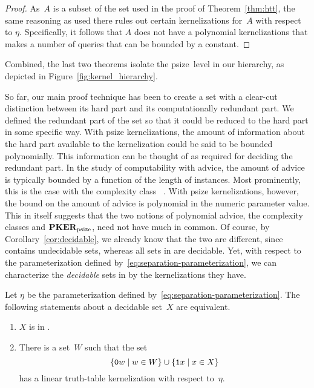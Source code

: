 \begin{proof}
  As~$A$ is a subset of the set used in the proof of Theorem~\ref{thm:htt}, the same reasoning as used there rules out certain kernelizations for~$A$ with respect to $\eta$.
  Specifically, it follows that $A$ does not have a polynomial kernelizations that makes a  number of queries that can be bounded by a constant.
\end{proof}

Combined, the last two theorems isolate the psize~level in our hierarchy, as depicted in Figure~\ref{fig:kernel_hierarchy}.

So far, our main proof technique has been to create a set with a clear-cut distinction between its hard part and its computationally redundant part.
We defined the redundant part of the set so that it could be reduced to the hard part in some specific way.
With psize kernelizations, the amount of information about the hard part available to the kernelization could be said to be bounded polynomially.
This information can be thought of as  required for deciding the redundant part.
In the study of computability with advice, the amount of advice is typically bounded by a function of the length of instances.
Most prominently, this is the case with the complexity class ~\parencite{arora2009computational}.
With psize kernelizations, however, the bound on the amount of advice is polynomial in the numeric parameter value.
This in itself suggests that the two notions of polynomial advice, the complexity classes  and $\textnormal{\textbf{PKER}}_\textnormal{psize}$, need not have much in common.
Of course, by Corollary~\ref{cor:decidable}, we already know that the two are different, since  contains undecidable sets, whereas all sets in  are decidable.
Yet, with respect to the parameterization defined by~\eqref{eq:separation-parameterization}, we can characterize the \emph{decidable} sets in  by the kernelizations they have.
\begin{theorem}
\label{thm:ppoly-tt}%
  Let $\eta$ be the parameterization defined by~\eqref{eq:separation-parameterization}.
  The following statements about a decidable set~$X$ are equivalent.
  \begin{enumerate}
  \item\label{enum:advice:ppoly}
    $X$ is in .
  \item\label{enum:advice:psize}
    There is a set~$W$ such that the set
    \begin{equation*}
      \{\textnormal{\texttt{0}}w \;|\; w \in W\} \cup \{\textnormal{\texttt{1}}x \;|\; x \in X\}
    \end{equation*}
    has a linear truth-table kernelization with respect to~$\eta$.
  \end{enumerate}
\end{theorem}
